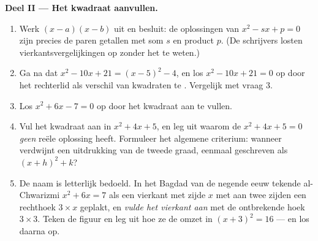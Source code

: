 \begin{problem}[{Weekendopgave --- som-en-productvraagstukken, het kwadraat
aanvullen zoals al-Chwarizmi het tekende, en de vergelijking
$x^2 = x + 1$}]
\medskip
\noindent\textbf{Deel II --- Het kwadraat aanvullen.}
\begin{enumerate}[resume]
  \item Werk $(x - a)(x - b)$ uit en besluit: de oplossingen van
        $x^2 - sx + p = 0$ zijn precies de paren getallen met som $s$ en
        product $p$. (De schrijvers losten vierkantsvergelijkingen op zonder
        het te weten.)
  \item Ga na dat $x^2 - 10x + 21 = (x - 5)^2 - 4$, en los
        $x^2 - 10x + 21 = 0$ op door het rechterlid als verschil van
        kwadraten te . Vergelijk met vraag 3.
  \item Los $x^2 + 6x - 7 = 0$ op door het kwadraat aan te vullen.
  \item Vul het kwadraat aan in $x^2 + 4x + 5$, en leg uit waarom de
         $x^2 + 4x + 5 = 0$ \emph{geen} reële oplossing heeft.
        Formuleer het algemene criterium: wanneer verdwijnt een uitdrukking
        van de tweede graad, eenmaal geschreven als $(x + h)^2 + k$?
  \item De naam is letterlijk bedoeld. In het Bagdad van de negende eeuw
        tekende al-Chwarizmi $x^2 + 6x = 7$ als een vierkant met zijde $x$
        met aan twee zijden een rechthoek $3 \times x$ geplakt, en
        \emph{vulde het vierkant aan} met de ontbrekende hoek $3 \times 3$.
        Teken de figuur en leg uit hoe ze de  omzet in
        $(x + 3)^2 = 16$ --- en los daarna op.
\end{enumerate}


\end{problem}
